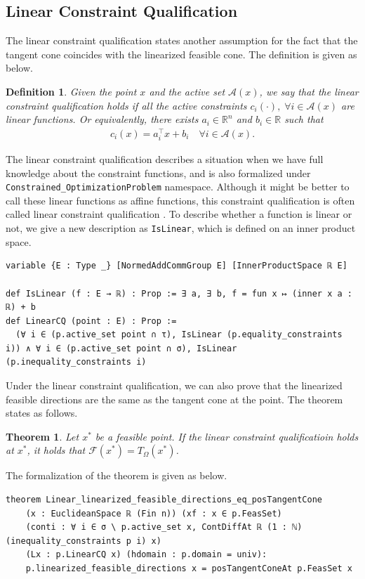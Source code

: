 \documentclass[sn-mathphys]{JORSC-jnl}%
\theoremstyle{thmstyleone}%
\newtheorem{theorem}{Theorem}%
\theoremstyle{thmstylethree}%
\newtheorem{definition}{Definition}%
\newcommand{\lean}[1]{\lstinline[language=lean, mathescape=true]{#1}}
\begin{document}
\subsection{Linear Constraint Qualification}\label{sec: Linear}
The linear constraint qualification states another assumption for the fact that the tangent cone coincides with the linearized feasible cone. The definition is given as below.
\begin{definition}
    Given the point $x$ and the active set $\mathcal{A}(x)$, we say that the linear constraint qualification holds if all the active constraints $c_i(\cdot), \; \forall i \in \mathcal{A}(x)$ are linear functions. Or equivalently, there exists $a_i \in \mathbb{R}^n$ and $b_i\in \mathbb{R}$ such that 
    \begin{align*}
        c_i(x) = a_i ^\top x + b_i \quad \forall i \in \mathcal{A}(x).
    \end{align*}
\end{definition}
The linear constraint qualification describes a situation when we have full knowledge about the constraint functions, and is also formalized under \lean{Constrained_OptimizationProblem} namespace. Although it might be better to call these linear functions as affine functions,  this constraint qualification is often called linear constraint qualification \cite{nocedal1999numerical}. To describe whether a function is linear or not, we give a new description as \lean{IsLinear}, which is defined on an inner product space. 
\begin{lstlisting}
variable {E : Type _} [NormedAddCommGroup E] [InnerProductSpace ℝ E]

def IsLinear (f : E → ℝ) : Prop := ∃ a, ∃ b, f = fun x ↦ (inner x a : ℝ) + b
def LinearCQ (point : E) : Prop :=
  (∀ i ∈ (p.active_set point ∩ τ), IsLinear (p.equality_constraints i)) ∧ ∀ i ∈ (p.active_set point ∩ σ), IsLinear (p.inequality_constraints i)
\end{lstlisting}
Under the linear constraint qualification, we can also prove that the linearized feasible directions are the same as the tangent cone at the point. The theorem states as follows.
\begin{theorem}\label{thm: Linear CQ}
    Let $x^\ast$ be a feasible point. If the linear constraint qualificatioin holds at $x^\ast$, it holds that $\mathcal{F}(x^\ast) = T_\Omega(x^\ast)$.
\end{theorem}
The formalization of the theorem is given as below.
\begin{lstlisting}
theorem Linear_linearized_feasible_directions_eq_posTangentCone
    (x : EuclideanSpace ℝ (Fin n)) (xf : x ∈ p.FeasSet)
    (conti : ∀ i ∈ σ \ p.active_set x, ContDiffAt ℝ (1 : ℕ) (inequality_constraints p i) x)
    (Lx : p.LinearCQ x) (hdomain : p.domain = univ):
    p.linearized_feasible_directions x = posTangentConeAt p.FeasSet x 
\end{lstlisting}
\end{document}

